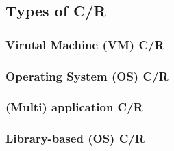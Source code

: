 \documentclass[compress]{beamer}
\begin{document}


\subsection{Types of C/R}     %



\begin{frame}
\frametitle{Virutal Machine (VM) C/R}




\end{frame}
  


\begin{frame}
\frametitle{Operating System (OS) C/R}




\end{frame}
  

\begin{frame}
\frametitle{(Multi) application C/R}






\end{frame}
  


\begin{frame}
\frametitle{Library-based (OS) C/R}






\end{frame}
  
\end{document}
